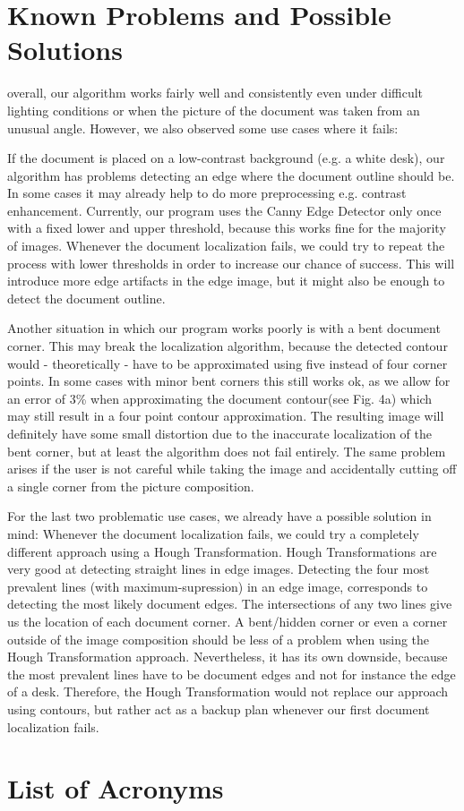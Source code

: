 \documentclass[bibliography=totoc]{scrartcl}
\begin{document}
	\section{Known Problems and Possible Solutions}
	overall, our algorithm works fairly well and consistently even under difficult lighting conditions or when the picture of the document was taken from an unusual angle.
	However, we also observed some use cases where it fails:
	
	If the document is placed on a low-contrast background (e.g. a white desk), our algorithm has problems detecting an edge where the document outline should be.
	In some cases it may already help to do more preprocessing e.g. contrast enhancement.
	Currently, our program uses the Canny Edge Detector only once with a fixed lower and upper threshold, because this works fine for the majority of images.
	Whenever the document localization fails, we could try to repeat the process with lower thresholds in order to increase our chance of success. 
	This will introduce more edge artifacts in the edge image, but it might also be enough to detect the document outline.

	Another situation in which our program works poorly is with a bent document corner. 
	This may break the localization algorithm, because the detected contour would - theoretically - have to be approximated using five instead of four corner points.
	In some cases with minor bent corners this still works ok, as we allow for an error of 3\% when approximating the document contour(see Fig. 4a) which may still result in a four point contour approximation. 
	The resulting image will definitely have some small distortion due to the inaccurate localization of the bent corner, but at least the algorithm does not fail entirely.
	The same problem arises if the user is not careful while taking the image and accidentally cutting off a single corner from the picture composition.
	
	For the last two problematic use cases, we already have a possible solution in mind: 
	Whenever the document localization fails, we could try a completely different approach using a Hough Transformation. 
	Hough Transformations are very good at detecting straight lines in edge images. 
	Detecting the four most prevalent lines (with maximum-supression) in an edge image, corresponds to detecting the most likely document edges.
	The intersections of any two lines give us the location of each document corner. 
	A bent/hidden corner or even a corner outside of the image composition should be less of a problem when using the Hough Transformation approach.
	Nevertheless, it has its own downside, because the most prevalent lines have to be document edges and not for instance the edge of a desk.
	Therefore, the Hough Transformation would not replace our approach using contours, but rather act as a backup plan whenever our first document localization fails.


\section*{List of Acronyms} 

\begin{acronym}[....]
\end{acronym}
			

\end{document}
